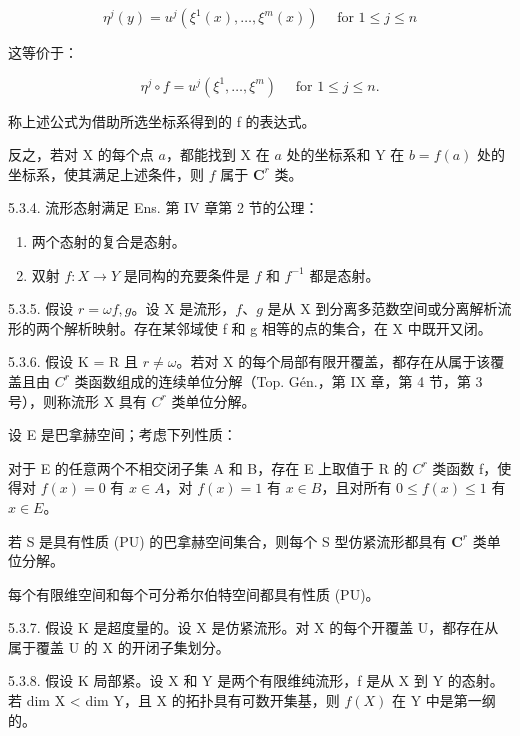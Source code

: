 \[
\eta^ {j} (y) = u ^ {j} (\xi^ {1} (x), \dots , \xi^ {m} (x)) \quad \text { for } 1 \leqslant j \leqslant n\tag{1}
\]

这等价于：

\[
\eta^ {j} \circ f = u ^ {j} (\xi^ {1}, \dots , \xi^ {m}) \quad \text { for } 1 \leqslant j \leqslant n.\tag{2}
\]

称上述公式为借助所选坐标系得到的 f 的表达式。

反之，若对 X 的每个点 \(a\)，都能找到 X 在 \(a\) 处的坐标系和 Y 在 \(b = f(a)\) 处的坐标系，使其满足上述条件，则 \(f\) 属于 \(\mathbf{C}^{r}\) 类。

5.3.4. 流形态射满足 Ens. 第 IV 章第 2 节的公理：

\begin{enumerate}
\def\labelenumi{\alph{enumi})}
\item
  两个态射的复合是态射。
\item
  双射 \(f:X\to Y\) 是同构的充要条件是 \(f\) 和 \(f^{-1}\) 都是态射。
\end{enumerate}

5.3.5. 假设 \(r = \omega\)\(f, g\)。设 X 是流形，\(f\)、\(g\) 是从 X 到分离多范数空间或分离解析流形的两个解析映射。存在某邻域使 f 和 g 相等的点的集合，在 X 中既开又闭。

5.3.6. 假设 K = R 且 \(r \neq \omega\)。若对 X 的每个局部有限开覆盖，都存在从属于该覆盖且由 \(C^{r}\) 类函数组成的连续单位分解（Top. Gén.，第 IX 章，第 4 节，第 3 号），则称流形 X 具有 \(C^{r}\) 类单位分解。

设 E 是巴拿赫空间；考虑下列性质：

对于 E 的任意两个不相交闭子集 A 和 B，存在 E 上取值于 R 的 \(C^{r}\) 类函数 f，使得对 \(f(x) = 0\) 有 \(x \in A\)，对 \(f(x) = 1\) 有 \(x \in B\)，且对所有 \(0 \leqslant f(x) \leqslant 1\) 有 \(x \in E\)。

若 S 是具有性质 (PU) 的巴拿赫空间集合，则每个 S 型仿紧流形都具有 \(\mathbf{C}^{r}\) 类单位分解。

每个有限维空间和每个可分希尔伯特空间都具有性质 (PU)。

5.3.7. 假设 K 是超度量的。设 X 是仿紧流形。对 X 的每个开覆盖 U，都存在从属于覆盖 U 的 X 的开闭子集划分。

5.3.8. 假设 K 局部紧。设 X 和 Y 是两个有限维纯流形，f 是从 X 到 Y 的态射。若 dim X \textless{} dim Y，且 X 的拓扑具有可数开集基，则 \(f(X)\) 在 Y 中是第一纲的。
\relax{}
